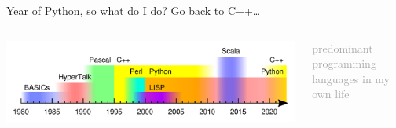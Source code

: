 \documentclass[aspectratio=169]{beamer}
\begin{document}
\begin{frame}{Year of Python, so what do I do? Go back to C++\ldots}
\Large
\vspace{0.5 cm}
\begin{columns}
\includegraphics[width=\linewidth]{personal-programming-languages.pdf}

\begin{center}
\vspace{-0.75 cm}
\textcolor{darkgray}{predominant programming languages in my own life}
\end{center}
\end{columns}
\end{frame}
\end{document}
